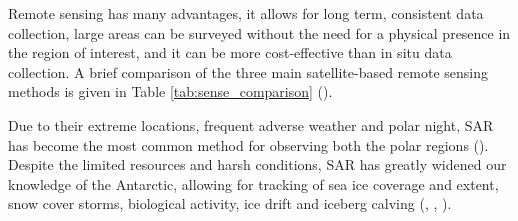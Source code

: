Remote sensing has many advantages, it allows for long term, consistent data collection, large areas can be surveyed without the need for a physical presence in the region of interest, and it can be more cost-effective than in situ data collection. A brief comparison of the three main satellite-based remote sensing methods is given in Table \ref{tab:sense_comparison} (\cite{agrawalCOMPARATIVEASSESSMENTREMOTE2019}).

\begin{table}[H]
\centering
{}
\caption{\textbf{Remote Sensing Techniques Comparison.} }
\label{tab:sense_comparison}
\end{table}

Due to their extreme locations, frequent adverse weather and polar night, \ac{SAR} has become the most common method for observing both the polar regions (\cite{comisoSatelliteRemoteSensing1991}). Despite the limited resources and harsh conditions, \ac{SAR} has greatly widened our knowledge of the Antarctic, allowing for tracking of sea ice coverage and extent, snow cover storms, biological activity, ice drift and iceberg calving (\cite{maslanikRemoteSensingAntarctica1990}, \cite{dirscherlRemoteSensingIce2020}, \cite{baumhoerRemoteSensingAntarctic2018}).

